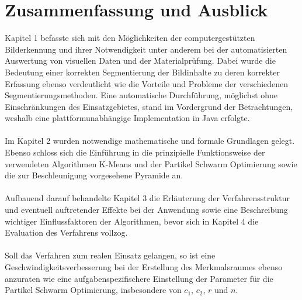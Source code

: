 \chapter{Zusammenfassung und Ausblick}
Kapitel 1 befasste sich mit den Möglichkeiten der computergestützten Bilderkennung und ihrer Notwendigkeit unter anderem bei der automatisierten Auswertung von visuellen Daten und der Materialprüfung. Dabei wurde die Bedeutung einer korrekten Segmentierung der Bildinhalte zu deren korrekter Erfassung ebenso verdeutlicht wie die Vorteile und Probleme der verschiedenen Segmentierungsmethoden.
Eine automatische Durchführung, möglichst ohne Einschränkungen des Einsatzgebietes, stand im Vordergrund der Betrachtungen, weshalb eine plattformunabhängige Implementation in Java erfolgte.
\\ \\   
Im Kapitel 2 wurden notwendige mathematische und formale Grundlagen gelegt. Ebenso schloss sich die Einführung in die prinzipielle Funktionsweise der verwendeten Algorithmen K-Means und der Partikel Schwarm Optimierung sowie die zur Beschleunigung vorgesehene Pyramide an.
\\ \\  
Aufbauend darauf behandelte Kapitel 3 die Erläuterung der Verfahrensstruktur und eventuell auftretender Effekte bei der Anwendung sowie eine Beschreibung wichtiger Einflussfaktoren der Algorithmen, bevor sich in Kapitel 4 die Evaluation des Verfahrens vollzog.
\\ \\
Soll das Verfahren zum realen Einsatz gelangen, so ist eine Geschwindigkeitsverbesserung bei der Erstellung des Merkmalsraumes ebenso anzuraten wie eine aufgabenspezifischere Einstellung der Parameter für die Partikel Schwarm Optimierung, insbesondere von $c_1$, $c_2$, $r$ und $n$.

